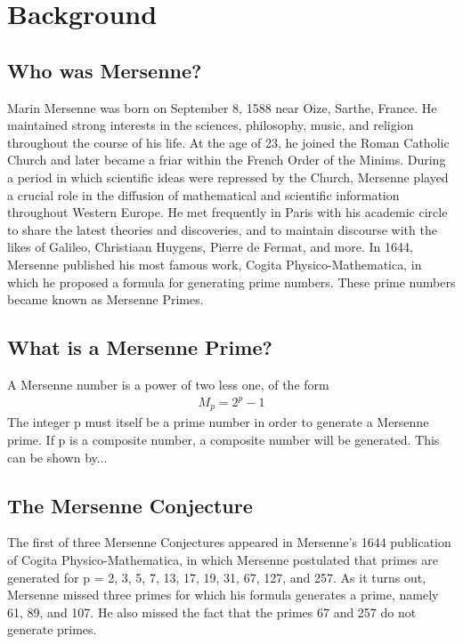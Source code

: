 \section{Background}

\subsection{Who was Mersenne?}
Marin Mersenne was born on September 8, 1588 near Oize, Sarthe, France. He maintained
strong interests in the sciences, philosophy, music, and religion throughout the course of his
life. At the age of 23, he joined the Roman Catholic Church and later became a friar within
the French Order of the Minims. During a period in which scientific ideas were repressed by
the Church, Mersenne played a crucial role in the diffusion of mathematical and scientific
information throughout Western Europe. He met frequently in Paris with his academic circle
to share the latest theories and discoveries, and to maintain discourse with the likes of Galileo,
Christiaan Huygens, Pierre de Fermat, and more. In 1644, Mersenne published his most famous
work, Cogita Physico-Mathematica, in which he proposed a formula for generating prime
numbers. These prime numbers became known as Mersenne Primes.

\subsection{What is a Mersenne Prime?}
A Mersenne number is a power of two less one, of the form
\begin{align}
M_p = 2^p - 1
\end{align}
The integer p must itself be a prime number in order to generate a Mersenne prime. If p is a
composite number, a composite number will be generated. This can be shown by...

\subsection{The Mersenne Conjecture}

The first of three Mersenne Conjectures appeared in Mersenne’s 1644 publication of Cogita
Physico-Mathematica, in which Mersenne postulated that primes are generated for p = 2, 3, 5,
7, 13, 17, 19, 31, 67, 127, and 257. As it turns out, Mersenne missed three primes for which his
formula generates a prime, namely 61, 89, and 107. He also missed the fact that the primes 67
and 257 do not generate primes.

